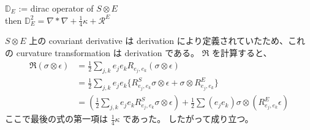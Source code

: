 \begin{Theorem}
\itemprop
  \Let \(\mathbb{D}_E\) := dirac operator of \(S \otimes E\) \\
  then \(\mathbb{D}_E^2 = \nabla * \nabla + \frac{1}{4}\kappa + \mathcal{R}^E\)
\end{Theorem}

\begin{Proof}
\itemprof
  \(S \otimes E\) 上の covariant derivative は derivation により定義されていたため、これの curvature transformation は derivation である。
  \(\mathfrak{R}\) を計算すると、
  \begin{align*}
    \mathfrak{R}(\sigma \otimes \epsilon)
    &= \frac{1}{2} \sum_{j,k} e_j e_k R_{e_j,e_k}(\sigma \otimes \epsilon) \\
    &= \frac{1}{2} \sum_{j,k} e_j e_k \{R^S_{e_j,e_k}\sigma \otimes \epsilon + \sigma \otimes R^E_{e_j,e_k}\} \\
    &= (\frac{1}{2} \sum_{j,k} e_j e_k R^S_{e_j,e_k} \sigma \otimes \epsilon) + \frac{1}{2} \sum (e_j e_k) \sigma \otimes (R^E_{e_j,e_k} \epsilon)
  \end{align*}
  ここで最後の式の第一項は \(\frac{1}{4}\kappa\) であった。
  したがって成り立つ。
\end{Proof}